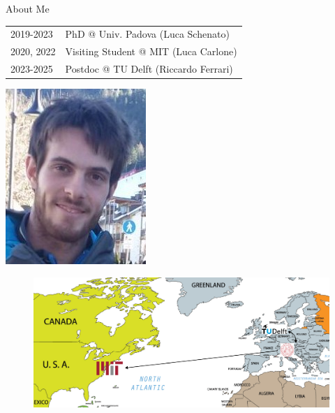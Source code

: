 \documentclass[10pt,xcolor={dvipsnames}]{beamer}
\begin{document}
	\begin{frame}{About Me}
		
		\begin{center}
			\begin{minipage}[l]{.6\textwidth}
				\centering
				\begin{tabular}{ll}
					2019-2023 & PhD @ Univ. Padova (Luca Schenato) \vspace{2mm}\\
					2020, 2022 & Visiting Student @ MIT (Luca Carlone) \vspace{2mm}\\
					2023-2025 & Postdoc @ TU Delft (Riccardo Ferrari)
				\end{tabular}
			\end{minipage}%
			\begin{minipage}[r]{.4\textwidth}
				\centering
				\includegraphics[width=.3\linewidth]{ballotta}
			\end{minipage}
		\end{center}
		
		\begin{figure}
			\centering
			\includegraphics[width=.85\linewidth]{trips}
		\end{figure}
		
	\end{frame}
	
\end{document}

